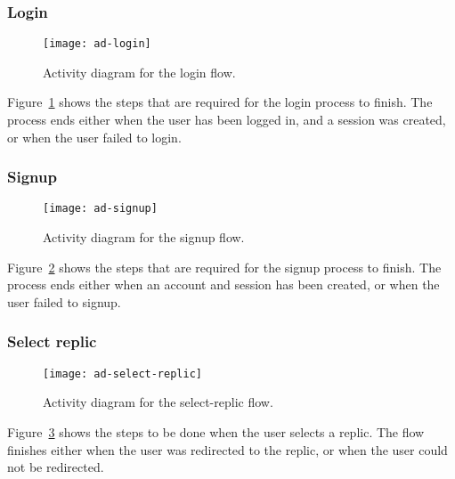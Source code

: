 \subsubsection{Login}
\begin{figure}
    \centering
    \texttt{[image: ad-login]}
    \caption{Activity diagram for the login flow.}
    \label{fig:ad:login}
\end{figure}

Figure~\ref{fig:ad:login} shows the steps that are required for the login process to finish.
The process ends either when the user has been logged in, and a session was created, or when the user failed to login.

\subsubsection{Signup}
\begin{figure}
    \centering
    \texttt{[image: ad-signup]}
    \caption{Activity diagram for the signup flow.}
    \label{fig:ad:signup}
\end{figure}

Figure~\ref{fig:ad:signup} shows the steps that are required for the signup process to finish.
The process ends either when an account and session has been created, or when the user failed to signup.

\subsubsection{Select replic}
\begin{figure}
    \centering
    \texttt{[image: ad-select-replic]}
    \caption{Activity diagram for the select-replic flow.}
    \label{fig:ad:select-replic}
\end{figure}

Figure~\ref{fig:ad:select-replic} shows the steps to be done when the user selects a replic.
The flow finishes either when the user was redirected to the replic, or when the user could not be redirected.